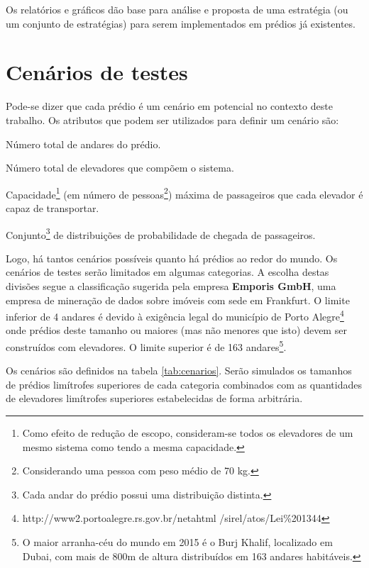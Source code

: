 Os relatórios e gráficos dão base para análise e proposta de uma estratégia (ou
um conjunto de estratégias) para serem implementados em prédios já existentes.

\section{\label{section:scenarios}Cenários de testes}

Pode-se dizer que cada prédio é um cenário em potencial no contexto deste
trabalho. Os atributos que podem ser utilizados para definir um cenário são:

\begin{description}[leftmargin=!,labelwidth=\widthof{\bfseries F}]\setlength\itemsep{0mm}
  \item[F]
  Número total de andares do prédio.
  \item[E]
  Número total de elevadores que compõem o sistema.
  \item[C]
  Capacidade\footnote{Como efeito de redução de escopo, consideram-se todos os
  elevadores de um mesmo sistema como tendo a mesma capacidade.} (em número de
  pessoas\footnote{Considerando uma pessoa com peso médio de 70 kg.}) máxima de
  passageiros que cada elevador é capaz de transportar.
  \item[D]
  Conjunto\footnote{Cada andar do prédio possui uma distribuição distinta.} de distribuições de probabilidade de chegada de passageiros.
\end{description}

Logo, há tantos cenários possíveis quanto há prédios ao redor do mundo. Os
cenários de testes serão limitados em algumas categorias. A escolha destas
divisões segue a classificação \cite{Emporis15} sugerida pela empresa
\textbf{Emporis GmbH}, uma empresa de mineração de dados sobre imóveis com sede
em Frankfurt. O limite inferior de 4 andares é devido à exigência legal do
município de Porto Alegre\footnote{http://www2.portoalegre.rs.gov.br/netahtml
/sirel/atos/Lei\%201344} onde prédios deste tamanho ou maiores (mas não menores
que isto) devem ser construídos com elevadores. O limite superior é de 163
andares\footnote{O maior arranha-céu do mundo em 2015 é o Burj Khalif,
localizado em Dubai, com mais de 800m de altura distribuídos em 163 andares
habitáveis.}.

Os cenários são definidos na tabela \ref{tab:cenarios}. Serão simulados os
tamanhos de prédios limítrofes superiores de cada categoria combinados com as
quantidades de elevadores limítrofes superiores estabelecidas de forma
arbitrária.

